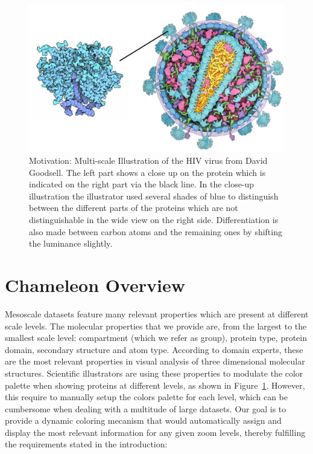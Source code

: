 \documentclass[review,journal]{vgtc}         %
\begin{document}
\begin{figure}
\centering
\includegraphics[width=1\linewidth]{Figures/motivation}
\caption{Motivation: Multi-scale Illustration of the HIV virus from David Goodsell. 
The left part shows a close up on the protein which is indicated on the right part via the black line.
In the close-up illustration the illustrator used several shades of blue to distinguish between the different parts of the proteins which are not distinguishable in the wide view on the right side.
Differentiation is also made between carbon atoms and the remaining ones by shifting the luminance slightly.}
\label{fig:motivation}
\end{figure}	

		
	\section{Chameleon Overview}
	\label{Overview}
	
	Mesoscale datasets feature many relevant properties which are present at different scale levels.
	The molecular properties that we provide are, from the largest to the smallest scale level: compartment (which we refer as group), protein type, protein domain, secondary structure and atom type.
	According to domain experts, these are the most relevant properties in visual analysis of three dimensional molecular structures.
	Scientific illustrators are using these properties to modulate the color palette when showing proteins at different levels, as shown in Figure~\ref{fig:motivation}.
	However, this require to manually setup the colors palette for each level, which can be cumbersome when dealing with a multitude of large datasets.
	Our goal is to provide a dynamic coloring mecanism that would automatically assign and display the most relevant information for any given zoom levels, thereby fulfilling the requirements stated in the introduction: 
		
\end{document}
